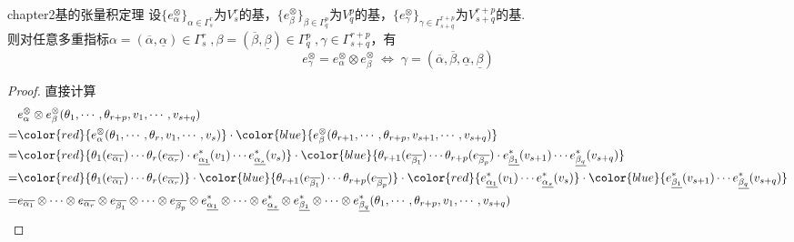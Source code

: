 \begin{mylem}{}{chapter2基的张量积定理}
	设$\{ e^{\otimes}_{\alpha}\}_{\alpha\in \Gamma^{r}_{s}}$为$V^{r}_{s}$的基，$\{ e^{\otimes}_{\beta}\}_{\beta\in \Gamma^{p}_{q}}$为$V^{p}_{q}$的基，$\{ e^{\otimes}_{\gamma}\}_{\gamma\in \Gamma^{r+p}_{s+q}}$为$V^{r+p}_{s+q}$的基.\\ 则对任意多重指标$\alpha=(\overline{\alpha},\underline{\alpha})\in \Gamma^{r}_{s}\;,\beta=(\overline{\beta},\underline{\beta})\in \Gamma^{p}_{q}\;,\gamma\in \Gamma^{r+p}_{s+q}$，有
\[
e^{\otimes}_{\gamma}=e^{\otimes}_{\alpha}\otimes e^{\otimes}_{\beta}\;\Leftrightarrow\; \gamma=(\overline{\alpha},\overline{\beta},\underline{\alpha},\underline{\beta})
\]
\end{mylem}
\begin{proof}
	直接计算
	\[
	\begin{split}
	&e^{\otimes}_{\alpha}\otimes e^{\otimes}_{\beta}(\theta_{1},\cdots,\theta_{r+p},v_{1},\cdots,v_{s+q})\\
    =&{\color{red}{e^{\otimes}_{\alpha}(\theta_{1},\cdots,\theta_{r},v_{1},\cdots,v_{s})}}\cdot {\color{blue}{e^{\otimes}_{\beta}(\theta_{r+1},\cdots,\theta_{r+p},v_{s+1},\cdots,v_{s+q})}}\\
    =&{\color{red}{\theta_{1}(e_{\overline{\alpha_{ 1 }}})\cdots\theta_{r}(e_{\overline{\alpha_{ r }}})\cdot e^{\ast}_{\underline{\alpha_{ 1}}}(v_{1})\cdots e^{\ast}_{\underline{\alpha_{s}}}(v_{s})}}\cdot{\color{blue}{\theta_{r+1}(e_{\overline{\beta_{ 1 }}})\cdots\theta_{r+p}(e_{\overline{\beta_{ p }}})\cdot e^{\ast}_{\underline{\beta_{1}}}(v_{s+1})\cdots e^{\ast}_{\underline{\beta_{ q}}}(v_{s+q})}}\\
    =&{\color{red}{\theta_{1}(e_{\overline{\alpha_{ 1 }}})\cdots\theta_{r}(e_{\overline{\alpha_{ r }}})}}\cdot
    {\color{blue}{\theta_{r+1}(e_{\overline{\beta_{ 1 }}})\cdots\theta_{r+p}(e_{\overline{\beta_{ p }}})}}\cdot
    {\color{red}{e^{\ast}_{\underline{\alpha_{ 1}}}(v_{1})\cdots e^{\ast}_{\underline{\alpha_{s}}}(v_{s})}}
    \cdot{\color{blue}{ e^{\ast}_{\underline{\beta_{1}}}(v_{s+1})\cdots e^{\ast}_{\underline{\beta_{ q}}}(v_{s+q})}}\\
    =&e_{\overline{\alpha_{ 1 }}}\otimes\cdots\otimes e_{\overline{\alpha_{ r }}}\otimes e_{\overline{\beta_{ 1 }}}\otimes\cdots\otimes e_{\overline{\beta_{ p }}}\otimes e^{\ast}_{\underline{\alpha_{ 1}}}\otimes \cdots \otimes e^{\ast}_{\underline{\alpha_{ s}}}\otimes e^{\ast}_{\underline{\beta_{ 1}}}\otimes\cdots\otimes e^{\ast}_{\underline{\beta_{q}}}(\theta_{1},\cdots,\theta_{r+p},v_{1},\cdots,v_{s+q})\\

\end{split}\]
\end{proof}
